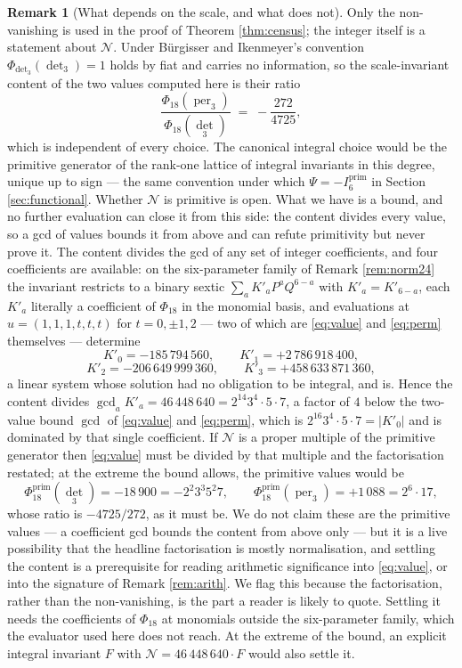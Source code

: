 \documentclass[11pt,reqno]{amsart}
\theoremstyle{plain}
\theoremstyle{definition}
\newtheorem{remark}[theorem]{Remark}
\DeclareMathOperator{\per}{per}
\begin{document}
\begin{remark}[What depends on the scale, and what does not]\label{rem:norm}
Only the non-vanishing is used in the proof of Theorem \ref{thm:census}; the
integer itself is a statement about $\mathcal N$.  Under B\"urgisser and
Ikenmeyer's convention $\Phi_{\det_3}(\det_3)=1$ holds by fiat and carries no
information, so the scale-invariant content of the two values computed here is
their ratio
\[
  \frac{\Phi_{18}(\per_3)}{\Phi_{18}(\det_3)}\;=\;-\frac{272}{4725},
\]
which is independent of every choice.  The canonical integral choice would be
the primitive generator of the rank-one lattice of integral invariants in this
degree, unique up to sign --- the same convention under which
$\Psi=-I_6^{\mathrm{prim}}$ in Section \ref{sec:functional}.  Whether
$\mathcal N$ is primitive is open.  What we have is a bound, and no further
evaluation can close it from this side: the content divides every value, so a
gcd of values bounds it from above and can refute primitivity but never prove
it.
The content divides the gcd of any set of integer coefficients, and four
coefficients are available: on the six-parameter family of Remark
\ref{rem:norm24} the invariant restricts to a binary sextic
$\sum_aK'_aP^{a}Q^{6-a}$ with $K'_a=K'_{6-a}$, each $K'_a$ literally a
coefficient of $\Phi_{18}$ in the monomial basis, and evaluations at
$u=(1,1,1,t,t,t)$ for $t=0,\pm1,2$ --- two of which are \eqref{eq:value} and
\eqref{eq:perm} themselves --- determine
\[
  K'_0=-185\,794\,560,\qquad K'_1=+2\,786\,918\,400,
\]
\[
  K'_2=-206\,649\,999\,360,\qquad K'_3=+458\,633\,871\,360,
\]
a linear system whose solution had no obligation to be integral, and is.
Hence the content divides
$\gcd_aK'_a=46\,448\,640=2^{14}3^{4}\cdot5\cdot7$, a factor of $4$ below the
two-value bound $\gcd$ of \eqref{eq:value} and \eqref{eq:perm}, which is
$2^{16}3^{4}\cdot5\cdot7=|K'_0|$ and is dominated by that single coefficient.
If $\mathcal N$ is a proper multiple of the primitive generator then
\eqref{eq:value} must be divided by that multiple and the factorisation
restated; at the extreme the bound allows, the primitive values would be
\[
  \Phi_{18}^{\mathrm{prim}}(\det_3)=-18\,900=-2^{2}3^{3}5^{2}7,
  \qquad
  \Phi_{18}^{\mathrm{prim}}(\per_3)=+1\,088=2^{6}\cdot17,
\]
whose ratio is $-4725/272$, as it must be.  We do not claim these are the
primitive values --- a coefficient gcd bounds the content from above only ---
but it is a live possibility that the headline factorisation is mostly
normalisation, and settling the content is a prerequisite for reading
arithmetic significance into \eqref{eq:value}, or into the signature of
Remark \ref{rem:arith}.  We flag this because the factorisation, rather than
the non-vanishing, is the part a reader is likely to quote.  Settling it needs
the coefficients of $\Phi_{18}$ at monomials outside the six-parameter family,
which the evaluator used here does not reach.  At the extreme of the bound, an
explicit integral invariant $F$ with $\mathcal N=46\,448\,640\cdot F$ would also
settle it.
\end{remark}
\end{document}
